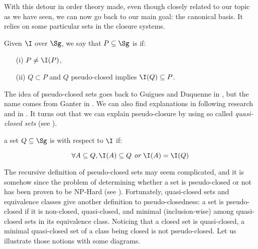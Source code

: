 With this detour in order theory made, even though closely related to our topic
as we have seen, we can now go back to our main goal: the canonical basis. It
relies on some particular sets in the closure systems.

\begin{definition} Given $\I$ over $\Sg$, we say
	that $P \subseteq \Sg$ is  if:
	\begin{itemize}
		\item[(i)] $P \neq \I(P)$,
		\item[(ii)] $Q \subset P$ and $Q$ pseudo-closed implies $\I(Q) 
		\subseteq P$.
	\end{itemize}
\end{definition}

\noindent The idea of pseudo-closed sets goes back to Guigues and Duquenne in
\cite{guigues_familles_1986}, but the name comes from Ganter in 
\cite{ganter_two_2010}. We can also find explanations in following 
research \cite{ganter_two_2010, day_lattice_1992} and
in \cite{ganter_conceptual_2016}. It turns out that we can explain 
pseudo-closure by using so called \textit{quasi-closed sets} (see 
\cite{wild_implicational_1989, ganter_two_2010, guigues_familles_1986}). 

\begin{definition} a set $Q \subseteq \Sg$ is 
	 with respect to $\I$ if:
	
	\[ \forall A \subseteq Q, \I(A) \subseteq Q \textit{ or } \I(A) = 
	\I(Q) \]
	
\end{definition}

\noindent The recursive definition of pseudo-closed sets may seem complicated,
and it is somehow since the problem of determining whether a set is 
pseudo-closed or not has been proven to be NP-Hard (see 
\cite{ganter_conceptual_2016}). Fortunately, quasi-closed sets and 
equivalence classes give another definition to pseudo-closedness: a set is 
pseudo-closed if it is non-closed, quasi-closed, and minimal (inclusion-wise) among quasi-closed sets in its equivalence class. Noticing that a closed set is quasi-closed, a minimal quasi-closed set of a class being closed is not pseudo-closed. Let us illustrate those notions with some diagrams.



